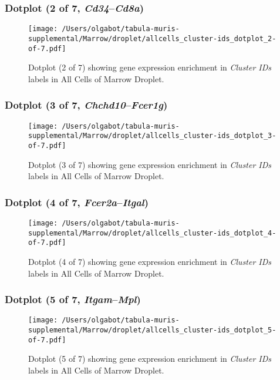 \clearpage

\subsubsection{Dotplot (2 of 7, \emph{Cd34}--\emph{Cd8a})}
\begin{figure}[h]
\centering
\texttt{[image: /Users/olgabot/tabula-muris-supplemental/Marrow/droplet/allcells\_cluster-ids\_dotplot\_2-of-7.pdf]}

\caption{ Dotplot (2 of 7)  showing gene expression enrichment in \emph{Cluster IDs} labels in All Cells of Marrow Droplet. }
\end{figure}


\clearpage

\subsubsection{Dotplot (3 of 7, \emph{Chchd10}--\emph{Fcer1g})}
\begin{figure}[h]
\centering
\texttt{[image: /Users/olgabot/tabula-muris-supplemental/Marrow/droplet/allcells\_cluster-ids\_dotplot\_3-of-7.pdf]}

\caption{ Dotplot (3 of 7)  showing gene expression enrichment in \emph{Cluster IDs} labels in All Cells of Marrow Droplet. }
\end{figure}


\clearpage

\subsubsection{Dotplot (4 of 7, \emph{Fcer2a}--\emph{Itgal})}
\begin{figure}[h]
\centering
\texttt{[image: /Users/olgabot/tabula-muris-supplemental/Marrow/droplet/allcells\_cluster-ids\_dotplot\_4-of-7.pdf]}

\caption{ Dotplot (4 of 7)  showing gene expression enrichment in \emph{Cluster IDs} labels in All Cells of Marrow Droplet. }
\end{figure}


\clearpage

\subsubsection{Dotplot (5 of 7, \emph{Itgam}--\emph{Mpl})}
\begin{figure}[h]
\centering
\texttt{[image: /Users/olgabot/tabula-muris-supplemental/Marrow/droplet/allcells\_cluster-ids\_dotplot\_5-of-7.pdf]}

\caption{ Dotplot (5 of 7)  showing gene expression enrichment in \emph{Cluster IDs} labels in All Cells of Marrow Droplet. }
\end{figure}


